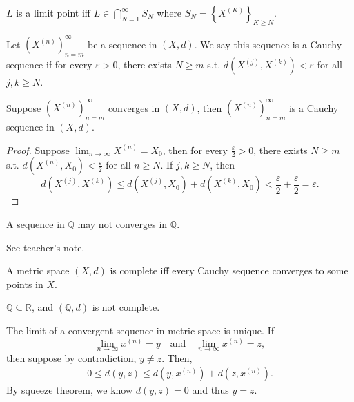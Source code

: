 \begin{proposition}
    \(L\) is a limit point iff \(L \in \bigcap_{N=1}^{\infty} \overline{S_N}  \) where \(S_N  = \left\{ X^{(K)} \right\}_{K \ge N} \). 
\end{proposition}

\begin{definition}
    Let \(\left( X^{(n)} \right)_{n=m}^{\infty}  \) be a sequence in \((X, d)\). We say this sequence is a Cauchy sequence if for every \(\varepsilon > 0\), there exists \(N \ge m\) s.t. \(d\left( X^{(j)}, X^{(k)} \right) < \varepsilon  \) for all \(j, k \ge N\).      
\end{definition}

\begin{lemma} \label{lm: converge equal Cauchy}
    Suppose \(\left( X^{(n)} \right)_{n=m}^{\infty}  \) converges in \((X, d)\), then \(\left( X^{(n)} \right)_{n=m}^{\infty}  \) is a Cauchy sequence in \((X, d)\).  
\end{lemma}
\begin{proof}
    Suppose \(\lim_{n \to \infty} X^{(n)} = X_0\), then for every \(\frac{\varepsilon}{2} > 0\), there exists \(N \ge m\) s.t. \(d\left( X^{(n)}, X_0 \right) < \frac{\varepsilon}{2}\) for all \(n \ge N\). If \(j, k \ge N\), then 
    \[
        d\left( X^{(j)}, X^{(k)} \right) \le d\left( X^{(j)}, X_0 \right) + d\left( X^{(k)}, X_0 \right) <\frac{\varepsilon}{2} + \frac{\varepsilon}{2} = \varepsilon.   
    \]      
\end{proof}

\begin{eg}
A sequence in \(\mathbb{Q} \) may not converges in \(\mathbb{Q} \).  
\end{eg}
\begin{explanation}
    See teacher's note.
\end{explanation}

\begin{definition} \label{def: complete}
    A metric space \((X, d)\) is complete iff every Cauchy sequence converges to some points in \(X\). 
\end{definition}

\begin{remark}
    \( \mathbb{Q} \subseteq \mathbb{R} \), and \((\mathbb{Q} ,d)\) is not complete. 
\end{remark}

\begin{remark}
    The limit of a convergent sequence in metric space is unique. If 
    \[
        \lim_{n \to \infty} x^{(n)} = y \quad \text{and} \quad \lim_{n \to \infty} x^{(n)} = z,
    \] then suppose by contradiction, \(y \neq z\). Then, 
    \begin{align*}
        0 \le d(y, z) \le d\left( y, x^{(n)} \right) + d\left( z, x^{(n)} \right) .
    \end{align*} 
    By squeeze theorem, we know \(d(y, z) = 0\) and thus \(y = z\).  
\end{remark}

